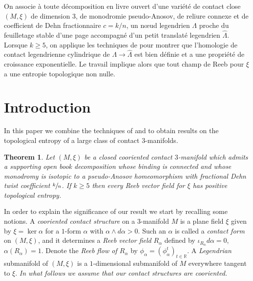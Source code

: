 \documentclass[JEP,XML,SOM,Unicode,NoFloatCountersInSection]{cedram}
\theoremstyle{plain}
\newtheorem{thm}{Theorem}[section]
\theoremstyle{definition}
\numberwithin{equation}{subsection}
\newcommand{\RR}{\mathbb{R}}
\begin{document}

\begin{altabstract}
On associe à toute décomposition en livre ouvert d'une variété de contact close $(M,\xi)$ de dimension $3$, de monodromie pseudo-Anosov, de reliure connexe et de coefficient de Dehn fractionnaire $c=k/n$, un n{\oe}ud legendrien $\Lambda$ proche du feuilletage stable d'une page accompagné d'un petit translaté legendrien $\widehat{\Lambda}$. Lorsque $k\geq 5$, on applique les techniques de \cite{CH2} pour montrer que l'homologie de contact legendrienne cylindrique de $\Lambda\rightarrow\widehat{\Lambda}$ est bien définie et a une propriété de croissance exponentielle. Le travail \cite{Al} implique alors que tout champ de Reeb pour $\xi$ a une entropie topologique non nulle.
\end{altabstract}

\maketitle
\tableofcontents
\mainmatter

\section{Introduction}

In this paper we combine the techniques of \cite{CH2} and \cite{Al} to obtain results on the topological entropy of a large class of contact $3$-manifolds.

\begin{thm}\label{thm: main}
Let $(M,\xi)$ be a closed cooriented contact $3$-manifold which admits a supporting open book decomposition whose binding is connected and whose monodromy is isotopic to a pseudo-Anosov homeomorphism with fractional Dehn twist coefficient $\sfrac{k}{n}$. If $k \geq 5$ then every Reeb vector field for $\xi$ has positive topological entropy.
\end{thm}

In order to explain the significance of our result we start by recalling some notions. A \textit{cooriented contact structure} on a $3$-manifold $M$ is a plane field $\xi$ given by $\xi = \ker \alpha$ for a $1$-form $\alpha$ with $\alpha \wedge d\alpha > 0$. Such an $\alpha$ is called a \textit{contact form} on $(M,\xi)$, and it determines a \textit{Reeb vector field} $R_{\alpha}$ defined by $\iota_{R_{\alpha}}d\alpha = 0$, $\alpha(R_{\alpha})= 1$. Denote the \textit{Reeb flow of $R_\alpha$} by $\phi_{\alpha}= (\phi_{\alpha}^t)_{t\in \RR}$. A \textit{Legendrian} submanifold of $(M,\xi)$ is a $1$-dimensional submanifold of $M$ everywhere tangent to $\xi$. {\em In what follows we assume that our contact structures are cooriented.}
\end{document}

